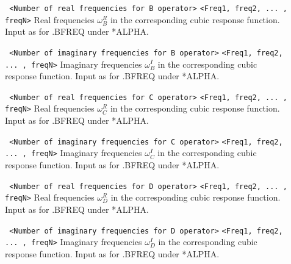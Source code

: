 \begin{description}
\item[] \verb| | \newline
\verb|<Number of real frequencies for B operator>|\newline
\verb|<Freq1, freq2, ... , freqN>|\newline
Real frequencies $\omega_B^R$ in the corresponding cubic response function.
Input as for .BFREQ under *ALPHA.
\item[] \verb| | \newline
\verb|<Number of imaginary frequencies for B operator>|\newline
\verb|<Freq1, freq2, ... , freqN>|\newline
Imaginary frequencies $\omega_B^I$ in the corresponding cubic response function.
Input as for .BFREQ under *ALPHA.
\item[] \verb| | \newline
\verb|<Number of real frequencies for C operator>|\newline
\verb|<Freq1, freq2, ... , freqN>|\newline
Real frequencies $\omega_C^R$ in the corresponding cubic response function.
Input as for .BFREQ under *ALPHA.
\item[] \verb| | \newline
\verb|<Number of imaginary frequencies for C operator>|\newline
\verb|<Freq1, freq2, ... , freqN>|\newline
Imaginary frequencies $\omega_C^I$ in the corresponding cubic response function.
Input as for .BFREQ under *ALPHA.
\item[] \verb| | \newline
\verb|<Number of real frequencies for D operator>|\newline
\verb|<Freq1, freq2, ... , freqN>|\newline
Real frequencies $\omega_D^R$ in the corresponding cubic response function.
Input as for .BFREQ under *ALPHA.
\item[] \verb| | \newline
\verb|<Number of imaginary frequencies for D operator>|\newline
\verb|<Freq1, freq2, ... , freqN>|\newline
Imaginary frequencies $\omega_D^I$ in the corresponding cubic response function.
Input as for .BFREQ under *ALPHA.
\end{description}


